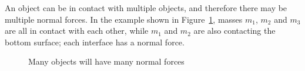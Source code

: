 An object can be in contact with multiple objects, and therefore there may be
multiple normal forces. In the example shown in
Figure~\ref{fig:many-normal-forces}, masses $m_1$, $m_2$ and $m_3$ are all in
contact with each other, while $m_1$ and $m_2$ are also contacting the bottom
surface; each interface has a normal force.
\begin{figure}[ht]
  \centering
  \caption{Many objects will have many normal forces}
  \label{fig:many-normal-forces}
\end{figure}



